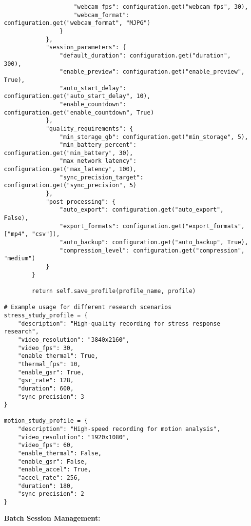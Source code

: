 \documentclass[11pt,a4paper]{article}
\begin{document}
\begin{verbatim}
                    "webcam_fps": configuration.get("webcam_fps", 30),
                    "webcam_format": configuration.get("webcam_format", "MJPG")
                }
            },
            "session_parameters": {
                "default_duration": configuration.get("duration", 300),
                "enable_preview": configuration.get("enable_preview", True),
                "auto_start_delay": configuration.get("auto_start_delay", 10),
                "enable_countdown": configuration.get("enable_countdown", True)
            },
            "quality_requirements": {
                "min_storage_gb": configuration.get("min_storage", 5),
                "min_battery_percent": configuration.get("min_battery", 30),
                "max_network_latency": configuration.get("max_latency", 100),
                "sync_precision_target": configuration.get("sync_precision", 5)
            },
            "post_processing": {
                "auto_export": configuration.get("auto_export", False),
                "export_formats": configuration.get("export_formats", ["mp4", "csv"]),
                "auto_backup": configuration.get("auto_backup", True),
                "compression_level": configuration.get("compression", "medium")
            }
        }

        return self.save_profile(profile_name, profile)

# Example usage for different research scenarios
stress_study_profile = {
    "description": "High-quality recording for stress response research",
    "video_resolution": "3840x2160",
    "video_fps": 30,
    "enable_thermal": True,
    "thermal_fps": 10,
    "enable_gsr": True,
    "gsr_rate": 128,
    "duration": 600,
    "sync_precision": 3
}

motion_study_profile = {
    "description": "High-speed recording for motion analysis",
    "video_resolution": "1920x1080",
    "video_fps": 60,
    "enable_thermal": False,
    "enable_gsr": False,
    "enable_accel": True,
    "accel_rate": 256,
    "duration": 180,
    "sync_precision": 2
}
\end{verbatim}

\textbf{Batch Session Management:}
\end{document}
